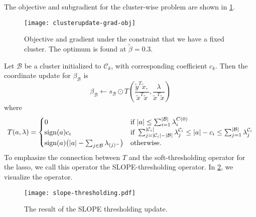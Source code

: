 The objective and subgradient for the cluster-wise problem are shown in
\cref{fig:cluster-grad-obj}.

\begin{figure}[htbp]
  \centering
  \texttt{[image: clusterupdate-grad-obj]}
  \caption{%
    Objective and gradient under the constraint that we have a fixed
    cluster.
    The optimum is found at \(\tilde\beta = 0.3\).
  }%
  \label{fig:cluster-grad-obj}
\end{figure}

Let \(\mathcal{B}\) be a cluster initialized to \(\mathcal{C}_k\), with
corresponding coefficient \(c_k\).
Then the coordinate update for \(\beta_\mathcal{B}\) is
\[
  \beta_\mathcal{B} \gets
  s_\mathcal{B} \odot
    T \left(
      \frac{
       \tilde y^T \tilde x,
      }{
       \tilde x^T \tilde x
      } , 
      \frac{
        \lambda 
      }{
        \tilde x^T \tilde x
      } 
    \right)
\]
where
\begin{equation}
  \label{eq:slope-thresholding}
  T(a, \lambda) =
  \begin{cases}
    0                                                        & \text{if } |a| \leq \sum_{i=1}^{|\mathcal{B}|}\lambda^{C(0)}_i                                                                                                                      \\
    \operatorname{sign}(a)c_i                                              & \text{if } \sum_{j= |\mathcal{C}_i| - |\mathcal{B}|}^{|\mathcal{C}_i|} \lambda^{\mathcal{C}_i}_j \leq |a| - c_i \leq \sum_{j=1}^{|\mathcal{B}|}\lambda^{\mathcal{C}_i}_j \\
    \operatorname{sign}(a)\big(|a| - \sum_{j \in \mathcal{B}}\lambda_{(j)^-}\big) & \text{otherwise.
    }
  \end{cases}
\end{equation}
To emphasize the connection between \(T\) and the soft-thresholding operator
for the lasso, we call this operator the SLOPE-thresholding operator.
In \cref{fig:slope-thresholding}, we visualize the operator.

\begin{figure}[htbp]
  \centering
  \texttt{[image: slope-thresholding.pdf]}
  \caption{The result of the SLOPE thresholding update.}
  \label{fig:slope-thresholding}
\end{figure}

